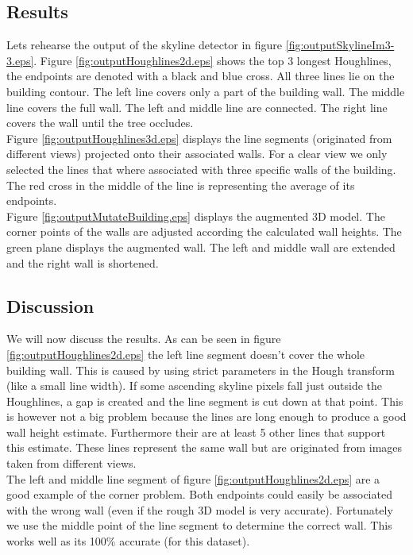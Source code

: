 \documentclass[10pt]{article}
\begin{document}
\subsection{Results}
Lets rehearse the output of the skyline detector in figure \ref{fig:outputSkylineIm3-3.eps}.
Figure \ref{fig:outputHoughlines2d.eps} shows the top 3 longest Houghlines, the
endpoints are denoted with a black and blue cross. All three lines lie on the
building contour.  The left line covers only a part of the building wall. The
middle line covers the full wall. The left and middle line are connected. The
right line covers the wall until the tree occludes.\\

Figure \ref{fig:outputHoughlines3d.eps} displays the line segments (originated from
different views) projected onto their associated walls.  For a clear view we
only selected the lines that where associated with three specific walls of the building.  
The red cross in the middle of the line is representing the average of its endpoints.\\

Figure \ref{fig:outputMutateBuilding.eps} displays the augmented 3D model. The
corner points of the walls are adjusted according the calculated wall heights.
The green plane displays the augmented wall. The left and middle wall are extended
and the right wall is shortened.\\


\subsection{Discussion}
We will now discuss the results. As can be seen in figure \ref{fig:outputHoughlines2d.eps} the left line segment doesn't cover the whole building wall. This is caused by using strict parameters in the Hough transform (like a small line width).
If some ascending skyline pixels fall just outside the Houghlines, a gap is created and the line segment is cut down at that point. This is however not a big problem because the lines are long enough to produce a good wall height estimate. Furthermore their are at least 5 other lines that support this estimate. These lines represent the same wall but are originated from images taken from different views. \\
The left and middle line segment of figure \ref{fig:outputHoughlines2d.eps} are a good example of the corner problem. Both endpoints could easily be associated with the wrong wall (even if the rough 3D model is very accurate). Fortunately we use the middle point of the line segment to determine the correct wall. This works well as its 100\% accurate (for this dataset).
\end{document}
